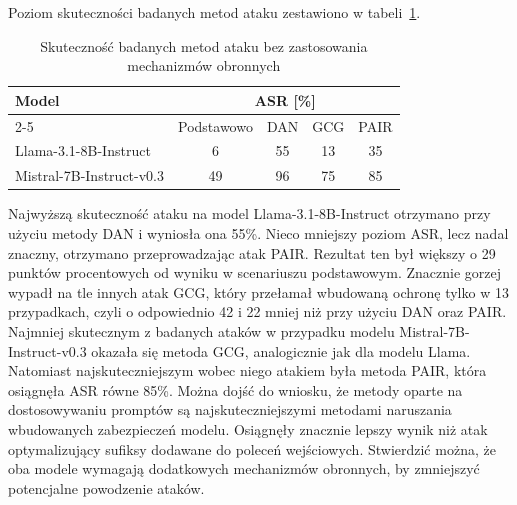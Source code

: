 Poziom skuteczności badanych metod ataku zestawiono w tabeli~\ref{tab:comparison_tab}.
\begin{table}[!ht]
    \centering
    \renewcommand{\arraystretch}{1.2}
    \begin{tabular}{l|c|c|c|c}
        \hline
        \multirow{2}{*}{\textbf{Model}} & \multicolumn{4}{c}{\textbf{ASR [\%]}}                    \\\cline{2-5}
                                        & Podstawowo                            & DAN & GCG & PAIR \\\hline
        Llama-3.1-8B-Instruct           & 6                                     & 55  & 13  & 35   \\\hline
        Mistral-7B-Instruct-v0.3        & 49                                    & 96  & 75  & 85   \\\hline
    \end{tabular}
    \caption{\label{tab:comparison_tab}Skuteczność badanych metod ataku bez zastosowania mechanizmów obronnych}
\end{table}
Najwyższą skuteczność ataku na model Llama-3.1-8B-Instruct otrzymano przy użyciu metody DAN i wyniosła ona 55\%. Nieco mniejszy poziom \gls{ASR}, lecz nadal znaczny, otrzymano przeprowadzając atak \gls{PAIR}. Rezultat ten był większy o 29 punktów procentowych od wyniku w scenariuszu podstawowym. Znacznie gorzej wypadł na tle innych atak GCG, który przełamał wbudowaną ochronę tylko w 13 przypadkach, czyli o odpowiednio 42 i 22 mniej niż przy użyciu \gls{DAN} oraz \gls{PAIR}. Najmniej skutecznym z badanych ataków w przypadku modelu Mistral-7B-Instruct-v0.3 okazała się metoda \gls{GCG}, analogicznie jak dla modelu Llama. Natomiast najskuteczniejszym wobec niego atakiem była metoda \gls{PAIR}, która osiągnęła \gls{ASR} równe 85\%. Można dojść do wniosku, że metody oparte na dostosowywaniu promptów są najskuteczniejszymi metodami naruszania wbudowanych zabezpieczeń modelu. Osiągnęły znacznie lepszy wynik niż atak optymalizujący sufiksy dodawane do poleceń wejściowych. Stwierdzić można, że oba modele wymagają dodatkowych mechanizmów obronnych, by zmniejszyć potencjalne powodzenie ataków.
